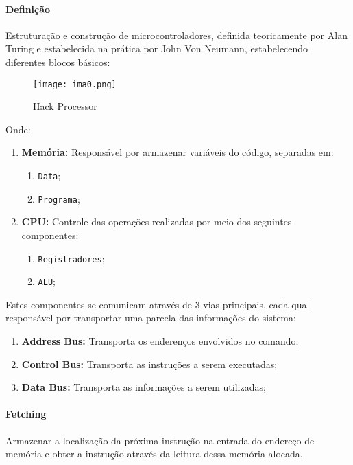 \documentclass{article}
\begin{document}
            \paragraph{Definição}Estruturação e construção de microcontroladores, definida teoricamente por Alan Turing e estabelecida na prática por John Von Neumann, estabelecendo diferentes blocos básicos:
                \begin{figure}[H]
                    \centering
                    \texttt{[image: ima0.png]}
                    \caption{Hack Processor}\label{fig:hackProcessor}
                \end{figure} \noindent
            Onde:
                \begin{enumerate}[rightmargin = \leftmargin, noitemsep]
                    \item \textbf{Memória:} Responsável por armazenar variáveis do código, separadas em:
                        \begin{enumerate}[rightmargin = \leftmargin, noitemsep]
                            \item \texttt{Data};
                            \item \texttt{Programa};
                        \end{enumerate}
                    \item \textbf{CPU:} Controle das operações realizadas por meio dos seguintes componentes:
                        \begin{enumerate}[rightmargin = \leftmargin, noitemsep]
                            \item \texttt{Registradores};
                            \item \texttt{ALU};
                        \end{enumerate}
                \end{enumerate}
            Estes componentes se comunicam através de 3 vias principais, cada qual responsável por transportar uma parcela das informações do sistema:
                \begin{enumerate}[rightmargin = \leftmargin, noitemsep]
                    \item \textbf{Address Bus:} Transporta os enderenços envolvidos no comando;
                    \item \textbf{Control Bus:} Transporta as instruções a serem executadas;
                    \item \textbf{Data Bus:} Transporta as informações a serem utilizadas;
                \end{enumerate}

            \paragraph{Fetching}Armazenar a localização da próxima instrução na entrada do endereço de memória e obter a instrução através da leitura dessa memória alocada.
\end{document}
